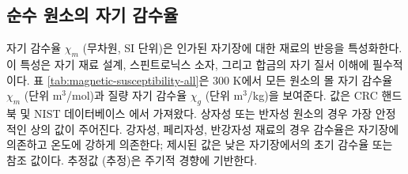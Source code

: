 \documentclass[12pt,a4paper]{article}
\begin{document}
	\subsection{순수 원소의 자기 감수율}
	\label{subsec:magnetic-susceptibility}
	
	자기 감수율 \(\chi_m\) (무차원, SI 단위)은 인가된 자기장에 대한 재료의 반응을 특성화한다. 이 특성은 자기 재료 설계, 스핀트로닉스 소자, 그리고 합금의 자기 질서 이해에 필수적이다. 표 \ref{tab:magnetic-susceptibility-all}은 300 K에서 모든 원소의 몰 자기 감수율 \(\chi_m\) (단위 m\(^3\)/mol)과 질량 자기 감수율 \(\chi_g\) (단위 m\(^3\)/kg)을 보여준다. 값은 CRC 핸드북 \cite{CRC} 및 NIST 데이터베이스 \cite{NIST}에서 가져왔다. 상자성 또는 반자성 원소의 경우 가장 안정적인 상의 값이 주어진다. 강자성, 페리자성, 반강자성 재료의 경우 감수율은 자기장에 의존하고 온도에 강하게 의존한다; 제시된 값은 낮은 자기장에서의 초기 감수율 또는 참조 값이다. 추정값 (추정)은 주기적 경향에 기반한다.
	
\end{document}
